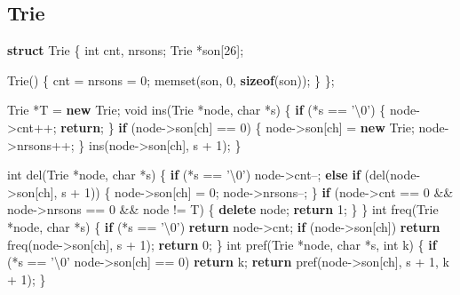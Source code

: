 \documentclass[10pt,]{article}
\newenvironment{Shaded}{}{}
\newcommand{\KeywordTok}[1]{\textcolor[rgb]{0.00,0.44,0.13}{\textbf{{#1}}}}
\newcommand{\DataTypeTok}[1]{\textcolor[rgb]{0.56,0.13,0.00}{{#1}}}
\newcommand{\DecValTok}[1]{\textcolor[rgb]{0.25,0.63,0.44}{{#1}}}
\newcommand{\NormalTok}[1]{{#1}}
\begin{document}
\subsection{Trie}

\begin{Shaded}
\begin{Highlighting}[]
\KeywordTok{struct} \NormalTok{Trie \{}
  \DataTypeTok{int} \NormalTok{cnt, nrsons;}
  \NormalTok{Trie *son[}\DecValTok{26}\NormalTok{];}

  \NormalTok{Trie() \{}
    \NormalTok{cnt = nrsons = }\DecValTok{0}\NormalTok{;}
    \NormalTok{memset(son, }\DecValTok{0}\NormalTok{, }\KeywordTok{sizeof}\NormalTok{(son));}
  \NormalTok{\}}
\NormalTok{\};}

\NormalTok{Trie *T = }\KeywordTok{new} \NormalTok{Trie;}
\DataTypeTok{void} \NormalTok{ins(Trie *node, }\DataTypeTok{char} \NormalTok{*s) \{}
  \KeywordTok{if} \NormalTok{(*s == '\textbackslash{}}\DecValTok{0}\NormalTok{') \{}
    \NormalTok{node->cnt++;}
    \KeywordTok{return}\NormalTok{;}
  \NormalTok{\}}
  \KeywordTok{if} \NormalTok{(node->son[ch] == }\DecValTok{0}\NormalTok{) \{}
    \NormalTok{node->son[ch] = }\KeywordTok{new} \NormalTok{Trie;}
    \NormalTok{node->nrsons++;}
  \NormalTok{\}}
  \NormalTok{ins(node->son[ch], s + }\DecValTok{1}\NormalTok{);}
\NormalTok{\}}

\DataTypeTok{int} \NormalTok{del(Trie *node, }\DataTypeTok{char} \NormalTok{*s) \{}
  \KeywordTok{if} \NormalTok{(*s == '\textbackslash{}}\DecValTok{0}\NormalTok{')}
    \NormalTok{node->cnt--;}
  \KeywordTok{else} \KeywordTok{if} \NormalTok{(del(node->son[ch], s + }\DecValTok{1}\NormalTok{)) \{}
    \NormalTok{node->son[ch] = }\DecValTok{0}\NormalTok{;}
    \NormalTok{node->nrsons--;}
  \NormalTok{\}}
  \KeywordTok{if} \NormalTok{(node->cnt == }\DecValTok{0} \NormalTok{&& node->nrsons == }\DecValTok{0} \NormalTok{&& node != T) \{}
    \KeywordTok{delete} \NormalTok{node;}
    \KeywordTok{return} \DecValTok{1}\NormalTok{;}
  \NormalTok{\}}
\NormalTok{\}}
\DataTypeTok{int} \NormalTok{freq(Trie *node, }\DataTypeTok{char} \NormalTok{*s) \{}
  \KeywordTok{if} \NormalTok{(*s == '\textbackslash{}}\DecValTok{0}\NormalTok{')}
    \KeywordTok{return} \NormalTok{node->cnt;}
  \KeywordTok{if} \NormalTok{(node->son[ch])}
    \KeywordTok{return} \NormalTok{freq(node->son[ch], s + }\DecValTok{1}\NormalTok{);}
  \KeywordTok{return} \DecValTok{0}\NormalTok{;}
\NormalTok{\}}
\DataTypeTok{int} \NormalTok{pref(Trie *node, }\DataTypeTok{char} \NormalTok{*s, }\DataTypeTok{int} \NormalTok{k) \{}
  \KeywordTok{if} \NormalTok{(*s == '\textbackslash{}}\DecValTok{0}\NormalTok{' \textbar{}\textbar{} node->son[ch] == }\DecValTok{0}\NormalTok{)}
    \KeywordTok{return} \NormalTok{k;}
  \KeywordTok{return} \NormalTok{pref(node->son[ch], s + }\DecValTok{1}\NormalTok{, k + }\DecValTok{1}\NormalTok{);}
\NormalTok{\}}
\end{Highlighting}
\end{Shaded}
\end{document}
